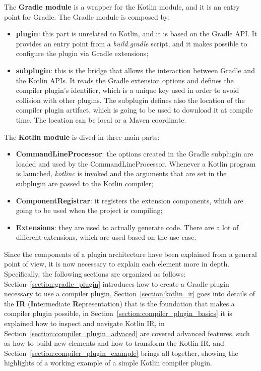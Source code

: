 The \textbf{Gradle module} is a wrapper for the Kotlin module, and it is an entry point for Gradle. The Gradle module is composed by:
\begin{itemize}
    \item \textbf{plugin}: this part is unrelated to Kotlin, and it is based on the Gradle API. It provides an entry point from a \textit{build.gradle} script, and it makes possible to configure the plugin via Gradle extensions;
    \item \textbf{subplugin}: this is the bridge that allows the interaction between Gradle and the Kotlin APIs. It reads the Gradle extension options and defines the compiler plugin's identifier, which is a unique key used in order to avoid collision with other plugins. The subplugin defines also the location of the compiler plugin artifact, which is going to be used to download it at compile time. The location can be local or a Maven coordinate.
\end{itemize}

\noindent The \textbf{Kotlin module} is dived in three main parts:
\begin{itemize}
    \item \textbf{CommandLineProcessor}: the options created in the Gradle subplugin are loaded and used by the CommandLineProcessor. Whenever a Kotlin program is launched, \textit{kotlinc} is invoked and the arguments that are set in the subplugin are passed to the Kotlin compiler;
    \item \textbf{ComponentRegistrar}: it registers the extension components, which are going to be used when the project is compiling;
    \item \textbf{Extensions}: they are used to actually generate code. There are a lot of different extensions, which are used based on the use case.
\end{itemize}

Since the components of a plugin architecture have been explained from a general point of view, it is now necessary to explain each element more in depth.\newline
Specifically, the following sections are organized as follows: Section~\ref{section:gradle_plugin} introduces how to create a Gradle plugin necessary to use a compiler plugin, Section~\ref{section:kotlin_ir} goes into details of the \textbf{IR} (\textbf{I}ntermediate \textbf{R}epresentation) that is the foundation that makes a compiler plugin possible, in Section~\ref{section:compiler_plugin_basics} it is explained how to inspect and navigate Kotlin IR, in Section~\ref{section:compiler_plugin_advaced} are covered advanced features, such as how to build new elements and how to transform the Kotlin IR, and Section~\ref{section:compiler_plugin_example} brings all together, showing the highlights of a working example of a simple Kotlin compiler plugin.

